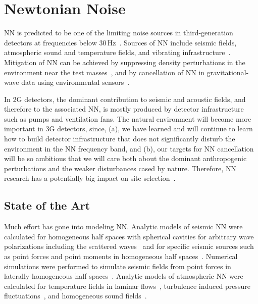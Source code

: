 
\chapter{Newtonian Noise}
\label{sec:Newtonian_Noise}
\vspace{0.5cm}
\Acf{NN} is predicted to be one of the limiting noise sources in third-generation detectors at frequencies below 30\,Hz~\cite{Saulson:NN,Har2015}. Sources of \ac{NN} include seismic fields, atmospheric sound and temperature fields, and vibrating infrastructure~\cite{HuTh1998,BeEA1998,Cre2008,FiEA2018,Har2015}. Mitigation of \ac{NN} can be achieved by suppressing density perturbations in the environment near the test masses~\cite{HaHi2014}, and by cancellation of \ac{NN} in gravitational-wave data using environmental sensors~\cite{Cel2000,CoEA2016a}.

\begin{samepage} %

In \ac{2G} detectors, the dominant contribution to seismic and acoustic fields, and therefore to the associated \ac{NN}, is mostly produced by detector infrastructure such as pumps and ventilation fans. The natural environment will become more important in \ac{3G} detectors, since, (a), we have learned and will continue to learn how to build detector infrastructure that does not significantly disturb the environment in the \ac{NN} frequency band, and (b), our targets for \ac{NN} cancellation will be so ambitious that we will care both about the dominant anthropogenic perturbations and the weaker disturbances cased by nature. Therefore, \ac{NN} research has a potentially big impact on site selection~\cite{BeEA2010}. 


\section{State of the Art}
Much effort has gone into modeling \ac{NN}. Analytic models of seismic \ac{NN} were calculated for homogeneous half spaces with spherical cavities for arbitrary wave polarizations including the scattered waves~\cite{Har2015} and for specific seismic sources such as point forces and point moments in homogeneous half spaces~\cite{HaEA2015,Har2016}. Numerical simulations were performed to simulate seismic fields from point forces in laterally homogeneous half spaces~\cite{BeEA2010c}. Analytic models of atmospheric \ac{NN} were calculated for temperature fields in laminar flows~\cite{Cre2008}, turbulence induced pressure fluctuations~\cite{Har2015}, and homogeneous sound fields~\cite{FiEA2018}. 

\end{samepage} %

